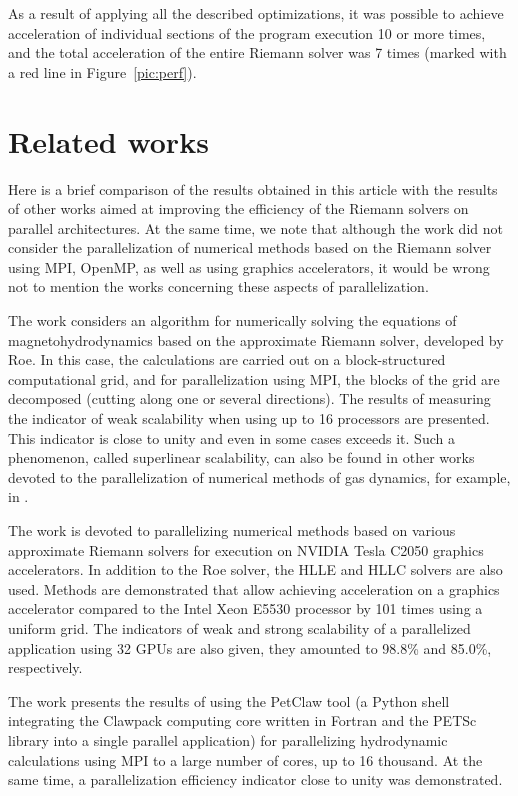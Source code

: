 \documentclass[utf8,english]{psta}%
\begin{document}
As a result of applying all the described optimizations, it was possible to achieve acceleration of individual sections of the program execution 10 or more times, and the total acceleration of the entire Riemann solver was 7 times (marked with a red line in Figure~\ref{pic:perf}).

\section{Related works}

Here is a brief comparison of the results obtained in this article with the results of other works aimed at improving the efficiency of the Riemann solvers on parallel architectures.
At the same time, we note that although the work did not consider the parallelization of numerical methods based on the Riemann solver using MPI, OpenMP, as well as using graphics accelerators, it would be wrong not to mention the works concerning these aspects of parallelization.

The work \cite{Shumlak} considers an algorithm for numerically solving the equations of magnetohydrodynamics based on the approximate Riemann solver, developed by Roe.
In this case, the calculations are carried out on a block-structured computational grid, and for parallelization using MPI, the blocks of the grid are decomposed (cutting along one or several directions).
The results of measuring the indicator of weak scalability when using up to 16 processors are presented.
This indicator is close to unity and even in some cases exceeds it.
Such a phenomenon, called superlinear scalability, can also be found in other works devoted to the parallelization of numerical methods of gas dynamics, for example, in \cite{Benderskij}.

The work \cite{Schive} is devoted to parallelizing numerical methods based on various approximate Riemann solvers for execution on NVIDIA Tesla C2050 graphics accelerators.
In addition to the Roe solver, the HLLE and HLLC \cite{Kong} solvers are also used.
Methods are demonstrated that allow achieving acceleration on a graphics accelerator compared to the Intel Xeon E5530 processor by 101 times using a uniform grid.
The indicators of weak and strong scalability of a parallelized application using 32 GPUs are also given, they amounted to 98.8\% and 85.0\%, respectively.

The work \cite{Mandli} presents the results of using the PetClaw tool (a Python shell integrating the Clawpack computing core written in Fortran and the PETSc library into a single parallel application) for parallelizing hydrodynamic calculations using MPI to a large number of cores, up to 16 thousand.
At the same time, a parallelization efficiency indicator close to unity was demonstrated.
\end{document}
